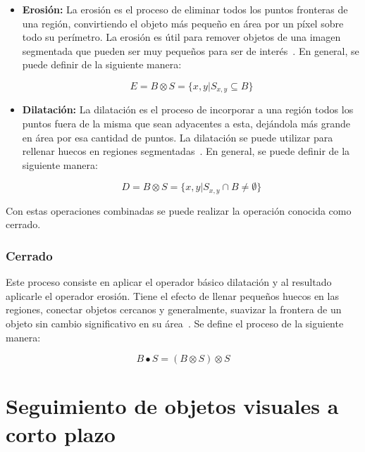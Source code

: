 \begin{itemize}
	\item \textbf{Erosión:} La erosión es el proceso de eliminar todos los puntos fronteras de una región, convirtiendo el objeto más pequeño en área por un píxel sobre todo su perímetro. La erosión es útil para remover objetos de una imagen segmentada que pueden ser muy pequeños para ser de interés~\cite{castleman1996digital}. En general, se puede definir de la siguiente manera:
	
	\begin{equation}
		E = B \otimes S = \{x, y | S_{x, y} \subseteq B\}
	\end{equation}

	\item \textbf{Dilatación:} La dilatación es el proceso de incorporar a una región todos los puntos fuera de la misma que sean adyacentes a esta, dejándola más grande en área por esa cantidad de puntos. La dilatación se puede utilizar para rellenar huecos en regiones segmentadas~\cite{castleman1996digital}. En general, se puede definir de la siguiente manera:
	
	\begin{equation}
		D = B \otimes S = \{x, y | S_{x, y} \cap B \neq \emptyset\}
	\end{equation}
\end{itemize}

Con estas operaciones combinadas se puede realizar la operación conocida como cerrado.

\subsubsection{Cerrado}

Este proceso consiste en aplicar el operador básico dilatación y al resultado aplicarle el operador erosión. Tiene el efecto de llenar pequeños huecos en las regiones, conectar objetos cercanos y generalmente, suavizar la frontera de un objeto sin cambio significativo en su área~\cite{castleman1996digital}. Se define el proceso de la siguiente manera:

\begin{equation}
	B \bullet S = (B \otimes S) \otimes S
\end{equation}

\section{Seguimiento de objetos visuales a corto plazo}\label{section:tracking}

